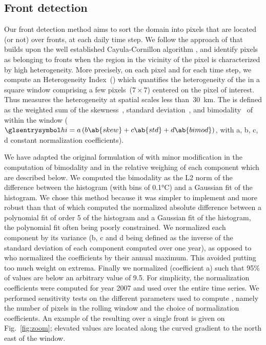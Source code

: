 \subsection{Front detection}

Our front detection method aims to sort the domain into pixels that are located (or not) over fronts, at each daily time step.
We follow the approach of \textcite{liu_2016} that builds upon the well established Cayula-Cornillon algorithm \parencite{cayula_1992, belkin_2009}, and identify pixels as belonging to fronts when the region in the vicinity of the pixel is characterized by high  heterogeneity.
More precisely, on each pixel and for each time step, we compute an Heterogeneity Index~() which quantifies the heterogeneity of the  in a square window comprising a few pixels~(\(7 \times 7\)) centered on the pixel of interest.
Thus  measures the  heterogeneity at spatial scales less than~\qty{30}{\km}.
The  is defined as the weighted sum of the skewness~, standard deviation~, and bimodality~ of  within the window (\(\am{hi} = a \left( b \ab{skew} + c \ab{std} + d \ab{bimod} \right)\), with a, b, c, d constant normalization coefficients).

We have adapted the original formulation of \textcite{liu_2016} with minor modification in the computation of bimodality and in the relative weighing of each component which are described below.
We computed the bimodality as the L2 norm of the difference between the  histogram (with bins of 0.1°C) and a Gaussian fit of the histogram.
We chose this method because it was simpler to implement and more robust than that of \textcite{liu_2016} which computed the normalized absolute difference between a polynomial fit of order 5 of the  histogram and a Gaussian fit of the histogram, the polynomial fit often being poorly constrained.
We normalized each component by its variance (b, c and d being defined as the inverse of the standard deviation of each component computed over one year), as opposed to \textcite{liu_2016} who normalized the coefficients by their annual maximum.
This avoided putting too much weight on extrema.
Finally we normalized  (coefficient a) such that 95\% of values are below an arbitrary value of 9.5.
For simplicity, the normalization coefficients were computed for year 2007 and used over the entire time series.
We performed sensitivity tests on the different parameters used to compute , namely the number of pixels in the rolling window and the choice of normalization coefficients.
An example of the resulting  over a single front is given on Fig.~\ref{fig:zoom}; elevated  values are located along the curved  gradient to the north east of the window.

